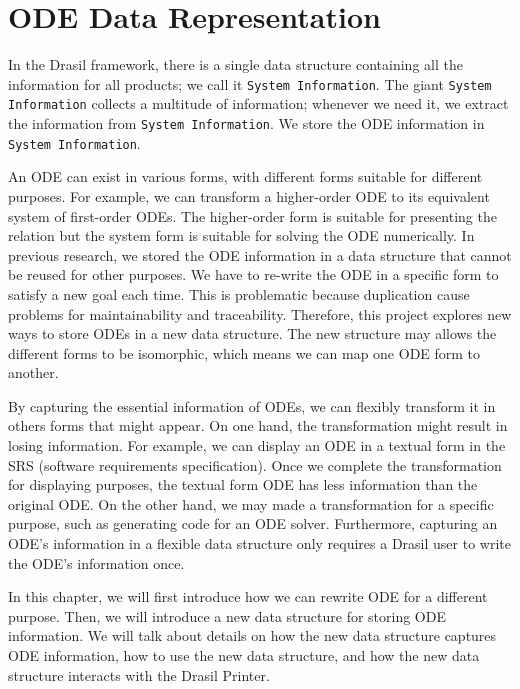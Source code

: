 \chapter{ODE Data Representation}
In the Drasil framework, there is a single data structure containing all the information for all products; we call it \verb|System Information|. The giant \verb|System Information| collects a multitude of information; whenever we need it, we extract the information from \verb|System Information|. We store the ODE information in \verb|System Information|. 

An ODE can exist in various forms, with different forms suitable for different purposes. For example, we can transform a higher-order ODE to its equivalent system of first-order ODEs. The higher-order form is suitable for presenting the relation but the system form is suitable for solving the ODE numerically. In previous research, we stored the ODE information in a data structure that cannot be reused for other purposes. We have to re-write the ODE in a specific form to satisfy a new goal each time. This is problematic because duplication cause problems for maintainability and traceability. Therefore, this project explores new ways to store ODEs in a new data structure. The new structure may allows the different forms to be isomorphic, which means we can map one ODE form to another. 

By capturing the essential information of ODEs, we can flexibly transform it in others forms that might appear. On one hand, the transformation might result in losing information. For example, we can display an ODE in a textual form in the SRS (software requirements specification). Once we complete the transformation for displaying purposes, the textual form ODE has less information than the original ODE. On the other hand, we may made a transformation for a specific purpose, such as generating code for an ODE solver. Furthermore, capturing an ODE's information in a flexible data structure only requires a Drasil user to write the ODE's information once.

In this chapter, we will first introduce how we can rewrite ODE for a different purpose. Then, we will introduce a new data structure for storing ODE information. We will talk about details on how the new data structure captures ODE information, how to use the new data structure, and how the new data structure interacts with the Drasil Printer.

